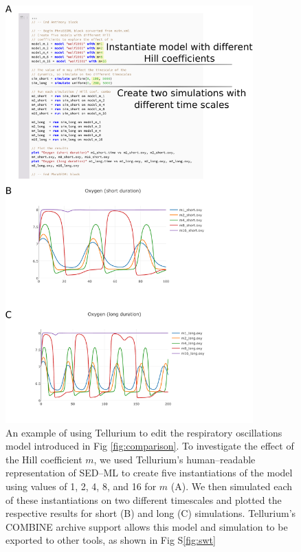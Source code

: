 \documentclass[10pt,letterpaper]{article}
\begin{document}
\begin{figure}
  \includegraphics[width=0.85\textwidth]{fig-hill2.pdf}
  \caption{An example of using Tellurium to edit the respiratory oscillations model introduced in Fig \ref{fig:comparison}. To investigate the effect of the Hill coefficient $m$, we used Tellurium's human--readable representation of SED--ML to create five instantiations of the model using values of 1, 2, 4, 8, and 16 for $m$ (A). We then simulated each of these instantiations on two different timescales and plotted the respective results for short (B) and long (C) simulations. Tellurium's COMBINE archive support allows this model and simulation to be exported to other tools, as shown in Fig S\ref{fig:swt} }
  \label{fig:hill}
\end{figure}

\end{document}
